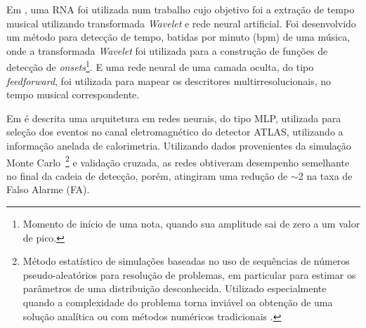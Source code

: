 %


Em , uma RNA foi utilizada num trabalho cujo objetivo foi a extração de tempo musical utilizando transformada \textit{Wavelet} e rede neural artificial. Foi desenvolvido um método para detecção de tempo, batidas por minuto (bpm) de uma música, onde a transformada \textit{Wavelet} foi utilizada para a construção de funções de detecção de \textit{onsets}\footnote{Momento de início de uma nota, quando sua amplitude sai de zero a um valor de pico.}. E uma rede neural de uma camada oculta, do tipo \textit{feedforward}, foi utilizada para mapear os descritores multirresolucionais, no tempo musical correspondente.
%
%

Em  é descrita uma arquitetura em redes neurais, do tipo MLP, utilizada para seleção dos eventos no canal eletromagnético do detector ATLAS, utilizando a informação anelada de calorimetria. Utilizando dados provenientes da simulação Monte Carlo~\footnote{Método estatístico de simulações baseadas no uso de sequências de números pseudo-aleatórios para resolução de problemas, em particular para estimar os parâmetros de uma distribuição desconhecida. Utilizado especialmente quando a complexidade do problema torna inviável oa obtenção de uma solução analítica ou com métodos numéricos tradicionais \cite[p. 27]{book:Braibant2012}.} e validação cruzada, as redes obtiveram desempenho semelhante no final da cadeia de detecção, porém, atingiram uma redução de $\sim$2 na taxa de Falso Alarme (FA).


